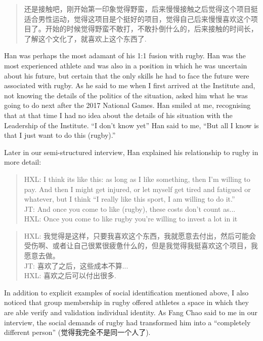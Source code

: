 \begin{CJK}{UTF8}{gbsn}
  \begin{quotation}
    还是接触吧，刚开始第一印象觉得野蛮，后来慢慢接触之后觉得这个项目挺适合男性运动，觉得这项目是个挺好的项目，觉得自己后来慢慢喜欢这个项目了。开始的时候觉得野蛮不敢打，不敢扑倒什么的，后来接触的时间长，了解这个文化了，就喜欢上这个东西了.
  \end{quotation}


Han was perhaps the most adamant of his 1:1 fusion with rugby.  Han was the most experienced athlete and was also in a position in which he was uncertain about his future, but certain that the only skills he had to face the future were associated with rugby.  As he said to me when I first arrived at the Institute and, not knowing the details of the politics of the situation, asked him what he was going to do next after the 2017 National Games.  Han smiled at me, recognising that at that time I had no idea about the details of his situation with the Leadership of the Institute. ``I don't know yet'' Han said to me, ``But all I know is that I just want to do this (rugby).''

Later in our semi-structured interview, Han explained his relationship to rugby in more detail:

    \begin{quotation}
      HXL: I think its like this: as long as I like something, then I’m willing to pay.  And then I might get injured, or let myself get tired and fatigued or whatever, but I think ``I really like this sport, I am willing to do it.''\\
      JT: And once you come to like (rugby), these costs don't count as...\\
      HXL: Once you come to like rugby you're willing to invest a lot in it
    \end{quotation}

    \begin{quotation}
      HXL: 我觉得是这样，只要我喜欢这个东西，我就愿意去付出，然后可能会受伤啊、或者让自己很累很疲惫什么的，但是我觉得我挺喜欢这个项目，我愿意去做。\\
      JT: 喜欢了之后，这些成本不算...\\
      HXL: 喜欢之后可以付出很多.
    \end{quotation}




In addition to explicit examples of social identification mentioned above, I also noticed that group membership in rugby offered athletes a space in which they are able verify and validation individual identity.  As Fang Chao said to me in our interview, the social demands of rugby had transformed him into a ``completely different person'' (觉得我完全不是同一个人了).


\end{CJK}
